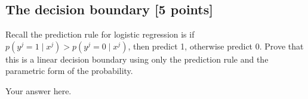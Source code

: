\documentclass[a4paper]{article}
\theoremstyle{definition}
\begin{document}
\subsection{The decision boundary [5 points]}

	Recall the prediction rule for logistic regression is if 
	$p(y^j=1\mid x^j)>p(y^j=0\mid x^j)$, then predict 1, otherwise predict 0.
	Prove that this is a linear decision boundary using only the prediction rule and the parametric form of the probability.
	
	{\color{blue} Your answer here.}
\end{document}

